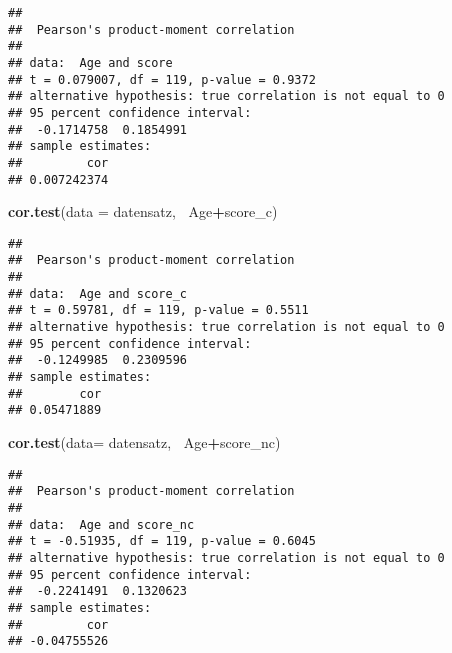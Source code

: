 \documentclass[]{article}
\newenvironment{Shaded}{\begin{snugshade}}{\end{snugshade}}
\newcommand{\KeywordTok}[1]{\textcolor[rgb]{0.13,0.29,0.53}{\textbf{#1}}}
\newcommand{\DataTypeTok}[1]{\textcolor[rgb]{0.13,0.29,0.53}{#1}}
\newcommand{\StringTok}[1]{\textcolor[rgb]{0.31,0.60,0.02}{#1}}
\newcommand{\CommentTok}[1]{\textcolor[rgb]{0.56,0.35,0.01}{\textit{#1}}}
\newcommand{\OperatorTok}[1]{\textcolor[rgb]{0.81,0.36,0.00}{\textbf{#1}}}
\newcommand{\NormalTok}[1]{#1}
\begin{document}
\begin{verbatim}
## 
##  Pearson's product-moment correlation
## 
## data:  Age and score
## t = 0.079007, df = 119, p-value = 0.9372
## alternative hypothesis: true correlation is not equal to 0
## 95 percent confidence interval:
##  -0.1714758  0.1854991
## sample estimates:
##         cor 
## 0.007242374
\end{verbatim}

\begin{Shaded}
\begin{Highlighting}[]
\KeywordTok{cor.test}\NormalTok{(}\DataTypeTok{data =}\NormalTok{ datensatz, }\OperatorTok{~}\NormalTok{Age}\OperatorTok{+}\NormalTok{score_c)}
\end{Highlighting}
\end{Shaded}

\begin{verbatim}
## 
##  Pearson's product-moment correlation
## 
## data:  Age and score_c
## t = 0.59781, df = 119, p-value = 0.5511
## alternative hypothesis: true correlation is not equal to 0
## 95 percent confidence interval:
##  -0.1249985  0.2309596
## sample estimates:
##        cor 
## 0.05471889
\end{verbatim}

\begin{Shaded}
\begin{Highlighting}[]
\KeywordTok{cor.test}\NormalTok{(}\DataTypeTok{data=}\NormalTok{ datensatz, }\OperatorTok{~}\NormalTok{Age}\OperatorTok{+}\NormalTok{score_nc)}
\end{Highlighting}
\end{Shaded}

\begin{verbatim}
## 
##  Pearson's product-moment correlation
## 
## data:  Age and score_nc
## t = -0.51935, df = 119, p-value = 0.6045
## alternative hypothesis: true correlation is not equal to 0
## 95 percent confidence interval:
##  -0.2241491  0.1320623
## sample estimates:
##         cor 
## -0.04755526
\end{verbatim}

\begin{Shaded}
\end{Shaded}
\end{document}

